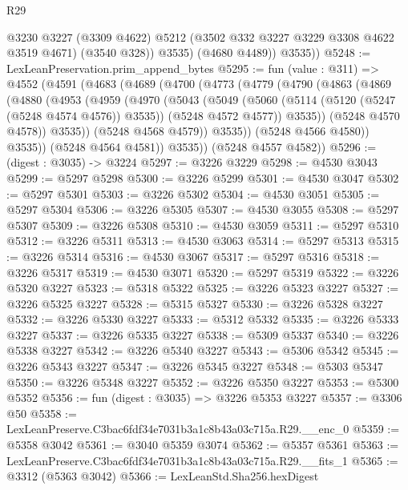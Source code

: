\begin{lexlean}{R29}
\begin{coremodule}
              @3230
              @3227
              (@3309 @4622)
              @5212
              (@3502 @332 @3227 @3229 @3308 @4622 @3519 @4671)
              (@3540 @328))
            @3535)
          (@4680 @4489))
        @3535))
@5248 := LexLeanPreservation.prim_append_bytes
@5295 := fun (value : @311) =>
  @4552
    (@4591
      (@4683
        (@4689
          (@4700
            (@4773
              (@4779
                (@4790
                  (@4863
                    (@4869
                      (@4880
                        (@4953
                          (@4959
                            (@4970
                              (@5043
                                (@5049
                                  (@5060
                                    (@5114 (@5120 (@5247 (@5248 @4574 @4576)) @3535))
                                    (@5248 @4572 @4577))
                                  @3535))
                              (@5248 @4570 @4578))
                            @3535))
                        (@5248 @4568 @4579))
                      @3535))
                  (@5248 @4566 @4580))
                @3535))
            (@5248 @4564 @4581))
          @3535))
      (@5248 @4557 @4582))
@5296 := (digest : @3035) -> @3224
@5297 := @3226 @3229
@5298 := @4530 @3043
@5299 := @5297 @5298
@5300 := @3226 @5299
@5301 := @4530 @3047
@5302 := @5297 @5301
@5303 := @3226 @5302
@5304 := @4530 @3051
@5305 := @5297 @5304
@5306 := @3226 @5305
@5307 := @4530 @3055
@5308 := @5297 @5307
@5309 := @3226 @5308
@5310 := @4530 @3059
@5311 := @5297 @5310
@5312 := @3226 @5311
@5313 := @4530 @3063
@5314 := @5297 @5313
@5315 := @3226 @5314
@5316 := @4530 @3067
@5317 := @5297 @5316
@5318 := @3226 @5317
@5319 := @4530 @3071
@5320 := @5297 @5319
@5322 := @3226 @5320 @3227
@5323 := @5318 @5322
@5325 := @3226 @5323 @3227
@5327 := @3226 @5325 @3227
@5328 := @5315 @5327
@5330 := @3226 @5328 @3227
@5332 := @3226 @5330 @3227
@5333 := @5312 @5332
@5335 := @3226 @5333 @3227
@5337 := @3226 @5335 @3227
@5338 := @5309 @5337
@5340 := @3226 @5338 @3227
@5342 := @3226 @5340 @3227
@5343 := @5306 @5342
@5345 := @3226 @5343 @3227
@5347 := @3226 @5345 @3227
@5348 := @5303 @5347
@5350 := @3226 @5348 @3227
@5352 := @3226 @5350 @3227
@5353 := @5300 @5352
@5356 := fun (digest : @3035) => @3226 @5353 @3227
@5357 := @3306 @50
@5358 := LexLeanPreserve.C3bac6fdf34e7031b3a1c8b43a03c715a.R29.__enc_0
@5359 := @5358 @3042
@5361 := @3040 @5359 @3074
@5362 := @5357 @5361
@5363 := LexLeanPreserve.C3bac6fdf34e7031b3a1c8b43a03c715a.R29.__fits_1
@5365 := @3312 (@5363 @3042)
@5366 := LexLeanStd.Sha256.hexDigest

\end{coremodule}
\end{lexlean}
